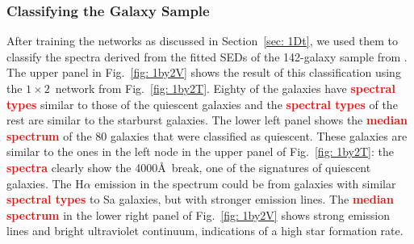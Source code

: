         \subsubsection{Classifying the Galaxy Sample}
         \label{sec: 1Dv}
            After training the networks as discussed in Section~\ref{sec: 1Dt}, we used them to classify the spectra derived from the fitted SEDs of the 142-galaxy sample from .
            The upper panel in Fig.~\ref{fig: 1by2V} shows the result of this classification using the $1\times2$~network from Fig.~\ref{fig: 1by2T}.
            Eighty of the galaxies have \textbf{\textcolor{red}{spectral types}} similar to those of the quiescent galaxies and the \textbf{\textcolor{red}{spectral types}} of the rest are similar to the starburst galaxies.
            The lower left panel shows the \textbf{\textcolor{red}{median spectrum}} of the 80 galaxies that were classified as quiescent. 
            These galaxies are similar to the ones in the left node in the upper panel of Fig.~\ref{fig: 1by2T}:
            the \textbf{\textcolor{red}{spectra}} clearly show the 4000\AA~break, one of the signatures of quiescent galaxies.
            The H$\alpha$ emission in the spectrum could be from galaxies with similar \textbf{\textcolor{red}{spectral types}} to Sa galaxies, but with stronger emission lines.
            The \textbf{\textcolor{red}{median spectrum}} in the lower right panel of Fig.~\ref{fig: 1by2V} shows strong emission lines and bright ultraviolet continuum, indications of a high star formation rate.
